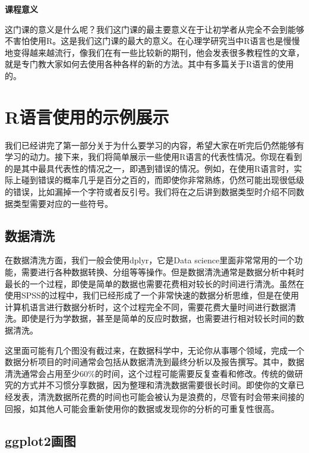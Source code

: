 \documentclass[
  oneside]{book}
\begin{document}
\textbf{课程意义}

这门课的意义是什么呢？我们这门课的最主要意义在于让初学者从完全不会到能够不害怕使用R。这是我们这门课的最大的意义。在心理学研究当中R语言也是慢慢地变得越来越流行，像我们在有一些比较新的期刊，他会发表很多教程性的文章，就是专门教大家如何去使用各种各样的新的方法。其中有多篇关于R语言的使用的。

\hypertarget{rux8bedux8a00ux4f7fux7528ux7684ux793aux4f8bux5c55ux793a}{%
\section{R语言使用的示例展示}\label{rux8bedux8a00ux4f7fux7528ux7684ux793aux4f8bux5c55ux793a}}

我们已经讲完了第一部分关于为什么要学习的内容，希望大家在听完后仍然能够有学习的动力。接下来，我们将简单展示一些使用R语言的代表性情况。你现在看到的是其中最具代表性的情况之一，即遇到错误的情况。例如，在使用R语言时，实际上碰到错误的概率几乎是百分之百的，而即使你非常熟练，仍然可能出现很低级的错误，比如漏掉一个字符或者反引号。我们将在之后讲到数据类型时介绍不同数据类型需要对应的一些符号。

\hypertarget{ux6570ux636eux6e05ux6d17}{%
\subsection{数据清洗}\label{ux6570ux636eux6e05ux6d17}}

在数据清洗方面，我们一般会使用dplyr，它是Data science里面非常常用的一个功能，需要进行各种数据转换、分组等等操作。但是数据清洗通常是数据分析中耗时最长的一个过程，即使是简单的数据也需要花费相对较长的时间进行清洗。虽然在使用SPSS的过程中，我们已经形成了一个非常快速的数据分析思维，但是在使用计算机语言进行数据分析时，这个过程完全不同，需要花费大量时间进行数据清洗。即使是行为学数据，甚至是简单的反应时数据，也需要进行相对较长时间的数据清洗。

这里面可能有几个图没有截过来，在数据科学中，无论你从事哪个领域，完成一个数据分析项目的时间通常会包括从数据清洗到最终分析以及报告撰写。其中，数据清洗通常会占用至少60\%的时间，这个过程可能需要反复查看和修改。传统的做研究的方式并不习惯分享数据，因为整理和清洗数据需要很长时间。即使你的文章已经发表，清洗数据所花费的时间也可能会被认为是浪费的，尽管有时会带来间接的回报，如其他人可能会重新使用你的数据或发现你的分析的可重复性很高。

\hypertarget{ggplot2ux753bux56fe}{%
\subsection{ggplot2画图}\label{ggplot2ux753bux56fe}}
\end{document}
